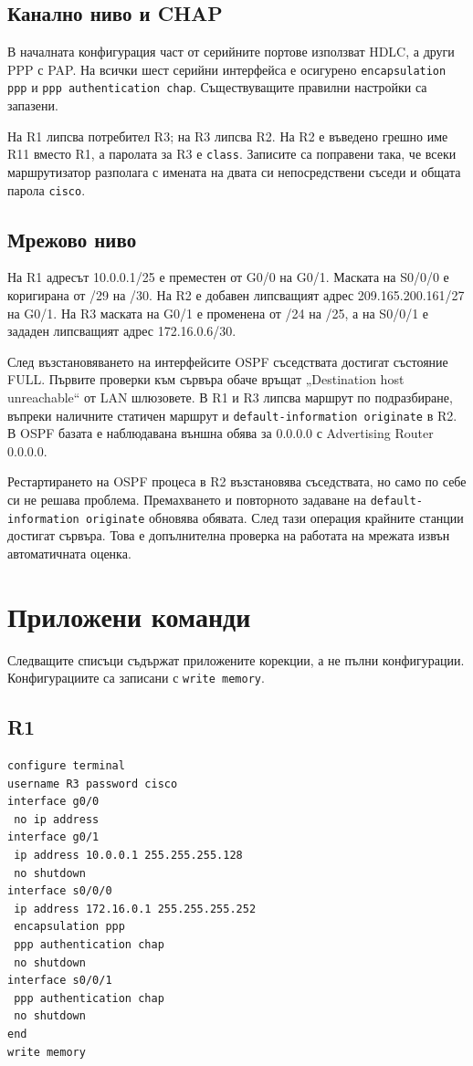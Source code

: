 \documentclass[12pt]{article}
\begin{document}
\subsection{Канално ниво и CHAP}
В началната конфигурация част от серийните портове използват HDLC, а други PPP с PAP. На всички шест серийни интерфейса е осигурено \texttt{encapsulation ppp} и \texttt{ppp authentication chap}. Съществуващите правилни настройки са запазени.

На R1 липсва потребител R3; на R3 липсва R2. На R2 е въведено грешно име R11 вместо R1, а паролата за R3 е \texttt{class}. Записите са поправени така, че всеки маршрутизатор разполага с имената на двата си непосредствени съседи и общата парола \texttt{cisco}.

\subsection{Мрежово ниво}
На R1 адресът 10.0.0.1/25 е преместен от G0/0 на G0/1. Маската на S0/0/0 е коригирана от /29 на /30. На R2 е добавен липсващият адрес 209.165.200.161/27 на G0/1. На R3 маската на G0/1 е променена от /24 на /25, а на S0/0/1 е зададен липсващият адрес 172.16.0.6/30.

След възстановяването на интерфейсите OSPF съседствата достигат състояние FULL. Първите проверки към сървъра обаче връщат „Destination host unreachable“ от LAN шлюзовете. В R1 и R3 липсва маршрут по подразбиране, въпреки наличните статичен маршрут и \texttt{default-information originate} в R2. В OSPF базата е наблюдавана външна обява за 0.0.0.0 с Advertising Router 0.0.0.0.

Рестартирането на OSPF процеса в R2 възстановява съседствата, но само по себе си не решава проблема. Премахването и повторното задаване на \texttt{default-information originate} обновява обявата. След тази операция крайните станции достигат сървъра. Това е допълнителна проверка на работата на мрежата извън автоматичната оценка.

\section{Приложени команди}
Следващите списъци съдържат приложените корекции, а не пълни конфигурации. Конфигурациите са записани с \texttt{write memory}.
\subsection{R1}
\begin{lstlisting}
configure terminal
username R3 password cisco
interface g0/0
 no ip address
interface g0/1
 ip address 10.0.0.1 255.255.255.128
 no shutdown
interface s0/0/0
 ip address 172.16.0.1 255.255.255.252
 encapsulation ppp
 ppp authentication chap
 no shutdown
interface s0/0/1
 ppp authentication chap
 no shutdown
end
write memory
\end{lstlisting}
\end{document}
